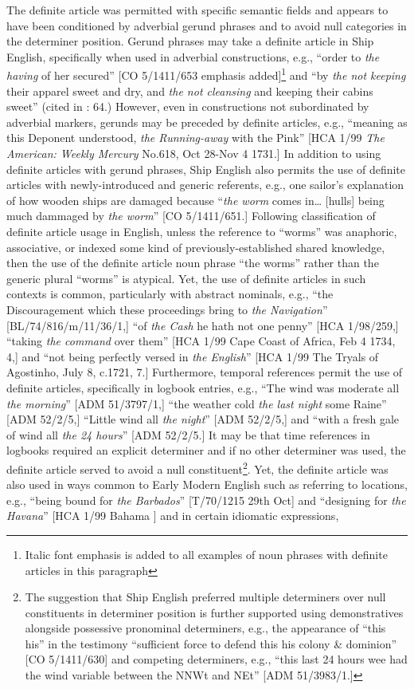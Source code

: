   The definite article was permitted with specific semantic fields and appears to have been conditioned by adverbial gerund phrases and to avoid null categories in the determiner position. Gerund phrases may take a definite article in Ship English, specifically when used in adverbial constructions, e.g., “order to \textit{the having} of her secured” [CO 5/1411/653 emphasis added]\footnote{Italic font emphasis is added to all examples of noun phrases with definite articles in this paragraph} and “by \textit{the not keeping} their apparel sweet and dry, and \textit{the not cleansing} and keeping their cabins sweet” (cited in \citealt{Brown2011}: 64.) However, even in constructions not subordinated by adverbial markers, gerunds may be preceded by definite articles, e.g., “meaning as this Deponent understood, \textit{the Running-away} with the Pink” [HCA 1/99 \textit{The American: Weekly Mercury} No.618, Oct 28-Nov 4 1731.] In addition to using definite articles with gerund phrases, Ship English also permits the use of definite articles with newly-introduced and generic referents, e.g., one sailor’s explanation of how wooden ships are damaged because “\textit{the worm} comes in… [hulls] being much dammaged by \textit{the worm}” [CO 5/1411/651.] Following  classification of definite article usage in English, unless the reference to “worms” was anaphoric, associative, or indexed some kind of previously-established shared knowledge, then the use of the definite article noun phrase “the worms” rather than the generic plural “worms” is atypical. Yet, the use of definite articles in such contexts is common, particularly with abstract nominals, e.g., “the Discouragement which these proceedings bring to \textit{the Navigation}” [BL/74/816/m/11/36/1,] “of \textit{the Cash} he hath not one penny” [HCA 1/98/259,] “taking \textit{the command} over them” [HCA 1/99 Cape Coast of Africa, Feb 4 1734, 4,] and “not being perfectly versed in \textit{the English}” [HCA 1/99 The Tryals of Agostinho, July 8, c.1721, 7.] Furthermore, temporal references permit the use of definite articles, specifically in logbook entries, e.g., “The wind was moderate all \textit{the morning}” [ADM 51/3797/1,] “the weather cold \textit{the last night} some Raine” [ADM 52/2/5,] “Little wind all \textit{the night}” [ADM 52/2/5,] and “with a fresh gale of wind all \textit{the 24 hours}” [ADM 52/2/5.] It may be that time references in logbooks required an explicit determiner and if no other determiner was used, the definite article served to avoid a null constituent\footnote{The suggestion that Ship English preferred multiple determiners over null constituents in determiner position is further supported using demonstratives alongside possessive pronominal determiners, e.g., the appearance of “this his” in the testimony “sufficient force to defend this his colony \& dominion” [CO 5/1411/630] and competing determiners, e.g., “this last 24 hours wee had the wind variable between the NNWt and NEt” [ADM 51/3983/1.]}. Yet, the definite article was also used in ways common to Early Modern English such as referring to locations, e.g., “being bound for \textit{the Barbados}” [T/70/1215 29th Oct] and “designing for \textit{the Havana}” [HCA 1/99 Bahama \citealt{Islands1722}] and in certain idiomatic expressions, 